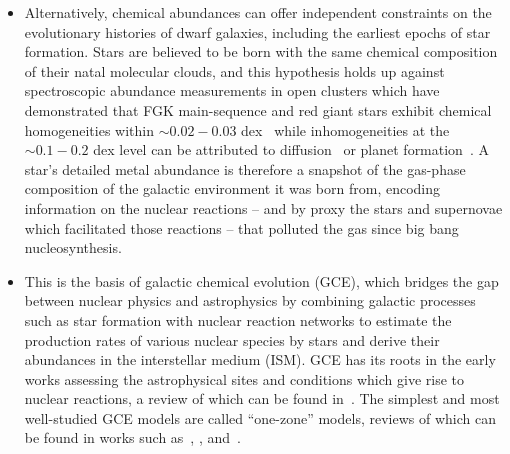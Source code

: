 \documentclass[ms.tex]{subfiles}
\begin{document}
\begin{itemize}
	\item Alternatively, chemical abundances can offer independent constraints
	on the evolutionary histories of dwarf galaxies, including the earliest
	epochs of star formation.
	Stars are believed to be born with the same chemical composition of their
	natal molecular clouds, and this hypothesis holds up against spectroscopic
	abundance measurements in open clusters which have demonstrated that FGK
	main-sequence and red giant stars exhibit chemical homogeneities within
	$\sim0.02 - 0.03$ dex~\citep{DeSilva2006, Liu2016b, Bovy2016,
	Casamiquela2020} while inhomogeneities at the~$\sim0.1 - 0.2$ dex level can
	be attributed to diffusion~\citep{BertelliMotta2018, Souto2019, Liu2019}
	or planet formation~\citep{Melendez2009, Liu2016a, Spina2018}.
	A star's detailed metal abundance is therefore a snapshot of the gas-phase
	composition of the galactic environment it was born from, encoding
	information on the nuclear reactions -- and by proxy the stars and
	supernovae which facilitated those reactions -- that polluted the gas since
	big bang nucleosynthesis.

	\item This is the basis of galactic chemical evolution (GCE), which bridges
	the gap between nuclear physics and astrophysics by combining galactic
	processes such as star formation with nuclear reaction networks to estimate
	the production rates of various nuclear species by stars and derive their
	abundances in the interstellar medium (ISM).
	GCE has its roots in the early works assessing the astrophysical sites and
	conditions which give rise to nuclear reactions, a review of which can be
	found in~\citet[][the famous ``B2FH'' paper]{Burbidge1957}.
	The simplest and most well-studied GCE models are called ``one-zone''
	models, reviews of which can be found in works such as~\citet{Tinsley1980},
	\citet{Pagel2009}, and~\citet{Matteucci2012, Matteucci2021}.



\end{itemize}
\end{document}
